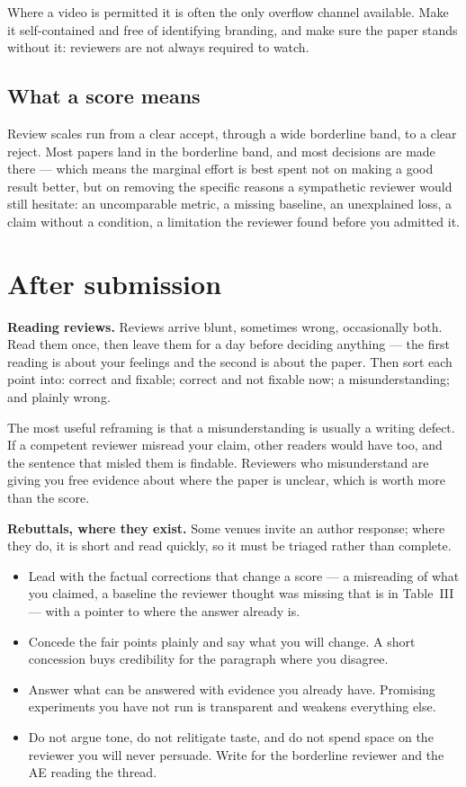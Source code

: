 \documentclass[11pt,a4paper]{article}
\newcommand{\lead}[1]{\medskip\noindent\textbf{#1}\quad}
\begin{document}
Where a video is permitted it is often the only overflow channel available.
Make it self-contained and free of identifying branding, and make sure the
paper stands without it: reviewers are not always required to watch.

\subsection*{What a score means}

Review scales run from a clear accept, through a wide borderline band, to a
clear reject. Most papers land in the borderline band, and most decisions are
made there --- which means the marginal effort is best spent not on making a
good result better, but on removing the specific reasons a sympathetic
reviewer would still hesitate: an uncomparable metric, a missing baseline, an
unexplained loss, a claim without a condition, a limitation the reviewer
found before you admitted it.

\section{After submission}

\lead{Reading reviews.} Reviews arrive blunt, sometimes wrong, occasionally
both. Read them once, then leave them for a day before deciding anything ---
the first reading is about your feelings and the second is about the paper.
Then sort each point into: correct and fixable; correct and not fixable now;
a misunderstanding; and plainly wrong.

The most useful reframing is that a misunderstanding is usually a writing
defect. If a competent reviewer misread your claim, other readers would have
too, and the sentence that misled them is findable. Reviewers who
misunderstand are giving you free evidence about where the paper is unclear,
which is worth more than the score.

\lead{Rebuttals, where they exist.} Some venues invite an author response;
where they do, it is short and read quickly, so it must be triaged rather
than complete.

\begin{itemize}
  \item Lead with the factual corrections that change a score --- a
    misreading of what you claimed, a baseline the reviewer thought was
    missing that is in Table~III --- with a pointer to where the answer
    already is.
  \item Concede the fair points plainly and say what you will change. A short
    concession buys credibility for the paragraph where you disagree.
  \item Answer what can be answered with evidence you already have. Promising
    experiments you have not run is transparent and weakens everything else.
  \item Do not argue tone, do not relitigate taste, and do not spend space on
    the reviewer you will never persuade. Write for the borderline reviewer
    and the AE reading the thread.
\end{itemize}
\end{document}
